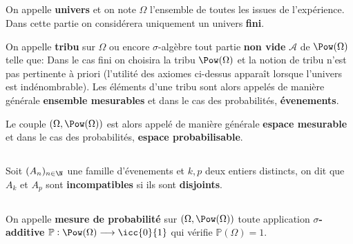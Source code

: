 \subsection*{}
On appelle \textbf{univers} et on note \(\Omega\) l'ensemble de toutes les issues de l'expérience. Dans cette partie on considérera uniquement un univers \textbf{fini}.\<

On appelle \textbf{tribu} sur \(\Omega\) ou encore \(\sigma\)-algèbre tout partie \textbf{non vide} \(\mathscr{A}\) de \(\Pow(\Omega)\) telle que:
Dans le cas fini on choisira la tribu \(\Pow(\Omega)\) et la notion de tribu n'est pas pertinente à priori (l'utilité des axiomes ci-dessus apparaît lorsque l'univers est indénombrable).\+
Les éléments d'une tribu sont alors appelés de manière générale \textbf{ensemble mesurables} et dans le cas des probabilités, \textbf{évenements}.\<

Le couple \((\Omega, \Pow(\Omega))\) est alors appelé de manière générale \textbf{espace mesurable} et dans le cas des probabilités, \textbf{espace probabilisable}. 

\subsection*{}
Soit \((A_n)_{n \in \N}\) une famille d'évenements et \(k, p\) deux entiers distincts, on dit que \(A_k\) et \(A_p\) sont \textbf{incompatibles} si ils sont \textbf{disjoints}.


\subsection*{}
On appelle \textbf{mesure de probabilité} sur \((\Omega, \Pow(\Omega))\) toute application \textbf{\(\sigma\)-additive} \(\mathbb{P} : \Pow(\Omega)\longrightarrow \icc{0}{1}\) qui vérifie \(\mathbb{P}(\Omega) = 1\).\< 

